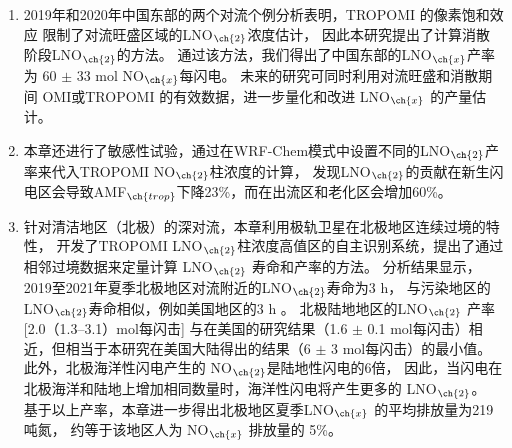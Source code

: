 \begin{enumerate}[label=（\arabic*）, labelindent=\parindent, nosep, leftmargin=0pt, widest=0, itemindent=*, topsep=0pt, partopsep=0pt, parsep=0pt]

\item 2019年和2020年中国东部的两个对流个例分析表明，TROPOMI 的像素饱和效应
限制了对流旺盛区域的LNO$_{\ch{2}}$浓度估计，
因此本研究提出了计算消散阶段LNO$_{\ch{2}}$的方法。
通过该方法，我们得出了中国东部的LNO$_{\ch{x}}$产率为 60 $\pm$ 33 mol NO$_{\ch{x}}$每闪电。
未来的研究可同时利用对流旺盛和消散期间 OMI或TROPOMI 的有效数据，进一步量化和改进 LNO$_{\ch{x}}$ 的产量估计。

\item 本章还进行了敏感性试验，通过在WRF-Chem模式中设置不同的LNO$_{\ch{2}}$产率来代入TROPOMI NO$_{\ch{2}}$柱浓度的计算，
发现LNO$_{\ch{2}}$的贡献在新生闪电区会导致AMF$_{\ch{trop}}$下降23\%，而在出流区和老化区会增加60\%。

\item 针对清洁地区（北极）的深对流，本章利用极轨卫星在北极地区连续过境的特性，
开发了TROPOMI LNO$_{\ch{2}}$柱浓度高值区的自主识别系统，提出了通过相邻过境数据来定量计算 LNO$_{\ch{2}}$ 寿命和产率的方法。
分析结果显示，2019至2021年夏季北极地区对流附近的LNO$_{\ch{2}}$寿命为3 h，
与污染地区的LNO$_{\ch{2}}$寿命相似，例如美国地区的3 h \citep{Nault.2017}。
北极陆地地区的LNO$_{\ch{2}}$ 产率 [2.0（1.3--3.1）mol每闪击] 与\citet{Lapierre.2020}在美国的研究结果（1.6 $\pm$ 0.1 mol每闪击）相近，但相当于本研究在美国大陆得出的结果（6 $\pm$ 3 mol每闪击）的最小值。
此外，北极海洋性闪电产生的 NO$_{\ch{2}}$是陆地性闪电的6倍，
因此，当闪电在北极海洋和陆地上增加相同数量时，海洋性闪电将产生更多的 LNO$_{\ch{2}}$。
基于以上产率，本章进一步得出北极地区夏季LNO$_{\ch{x}}$ 的平均排放量为219吨氮，
约等于该地区人为 NO$_{\ch{x}}$ 排放量的 5\%。

\end{enumerate}


